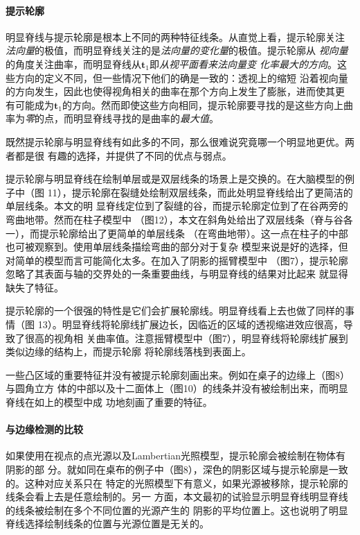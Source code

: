\documentclass[10pt,a4paper]{article}
\theoremstyle{mythm}%
\numberwithin{equation}{section}
\begin{document}
\begin{CJK*}{UTF8}{wqyzh}
\paragraph*{提示轮廓}
明显脊线与提示轮廓是根本上不同的两种特征线条。从直觉上看，提示轮廓关注
\emph{法向量}的极值，而明显脊线关注的是\emph{法向量的变化量}的极值。提示轮廓从
\emph{视向量}的角度关注曲率，而明显脊线从$\bm{t}_1$即\emph{从视平面看来法向量变
化率最大的方向}。这些方向的定义不同，但一些情况下他们的确是一致的：透视上的缩短
沿着视向量的方向发生，因此也使得视角相关的曲率在那个方向上发生了膨胀，进而使其更
有可能成为$\bm{t}_1$的方向。然而即使这些方向相同，提示轮廓要寻找的是这些方向上曲
率为\emph{零}的点，而明显脊线寻找的是曲率的\emph{最大值}。

既然提示轮廓与明显脊线有如此多的不同，那么很难说究竟哪一个明显地更优。两者都是很
有趣的选择，并提供了不同的优点与弱点。

提示轮廓与明显脊线在绘制单层或是双层线条的场景上是交换的。在大脑模型的例子中（图
11），提示轮廓在裂缝处绘制双层线条，而此处明显脊线给出了更简洁的单层线条。本文的明
显脊线定位到了裂缝的谷，而提示轮廓定位到了在谷两旁的弯曲地带。然而在柱子模型中
（图12），本文在斜角处给出了双层线条（脊与谷各一），而提示轮廓给出了更简单的单层线条
（在弯曲地带）。这一点在柱子的中部也可被观察到。使用单层线条描绘弯曲的部分对于复杂
模型来说是好的选择，但对简单的模型而言可能简化太多。在加入了阴影的摇臂模型中
（图7），提示轮廓忽略了其表面与轴的交界处的一条重要曲线，与明显脊线的结果对比起来
就显得缺失了特征。

提示轮廓的一个很强的特性是它们会扩展轮廓线。明显脊线看上去也做了同样的事情（图
13）。明显脊线将轮廓线扩展边长，因临近的区域的透视缩进效应很高，导致了很高的视角相
关曲率值。注意摇臂模型中（图7），明显脊线将轮廓线扩展到类似边缘的结构上，而提示轮廓
将轮廓线落栈到表面上。

一些凸区域的重要特征并没有被提示轮廓刻画出来。例如在桌子的边缘上（图8）与圆角立方
体的中部以及十二面体上（图10）的线条并没有被绘制出来，而明显脊线在如上的模型中成
功地刻画了重要的特征。

\paragraph*{与边缘检测的比较}

如果使用在视点的点光源以及Lambertian光照模型，提示轮廓会被绘制在物体有阴影的部
分。就如同在桌布的例子中（图8），深色的阴影区域与提示轮廓是一致的。这种对应关系只在
特定的光照模型下有意义，如果光源被移除，提示轮廓的线条会看上去是任意绘制的。另一
方面，本文最初的试验显示明显脊线明显脊线的线条被绘制在多个不同位置的光源产生的
阴影的平均位置上。这也说明了明显脊线选择绘制线条的位置与光源位置是无关的。


\end{CJK*}
\end{document}
